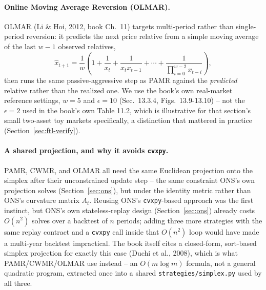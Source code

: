\documentclass[11pt]{article}
\begin{document}
\paragraph{Online Moving Average Reversion (OLMAR).}
OLMAR (Li \& Hoi, 2012, book Ch.~11) targets multi-period rather than
single-period reversion: it predicts the next price relative from a
simple moving average of the last $w-1$ observed relatives,
\[
    \hat{x}_{t+1} = \frac{1}{w}\left(1 + \frac{1}{x_t} + \frac{1}{x_t x_{t-1}}
    + \cdots + \frac{1}{\prod_{i=0}^{w-2} x_{t-i}}\right),
\]
then runs the same passive-aggressive step as PAMR against the
\emph{predicted} relative rather than the realized one. We use the
book's own real-market reference settings, $w=5$ and $\epsilon=10$
(Sec.~13.3.4, Figs.~13.9-13.10) -- not the $\epsilon=2$ used in the
book's own Table 11.2, which is illustrative for that section's small
two-asset toy markets specifically, a distinction that mattered in
practice (Section~\ref{sec:ftl-verify}).

\paragraph{A shared projection, and why it avoids \texttt{cvxpy}.}
PAMR, CWMR, and OLMAR all need the same Euclidean projection onto the
simplex after their unconstrained update step -- the same constraint
ONS's own projection solves (Section~\ref{sec:ons}), but under the
identity metric rather than ONS's curvature matrix $A_t$. Reusing
ONS's \texttt{cvxpy}-based approach was the first instinct, but ONS's
own stateless-replay design (Section~\ref{sec:ons}) already costs
$O(n^2)$ solves over a backtest of $n$ periods; adding three more
strategies with the same replay contract and a \texttt{cvxpy} call
inside that $O(n^2)$ loop would have made a multi-year backtest
impractical. The book itself cites a closed-form, sort-based simplex
projection for exactly this case (Duchi et al., 2008), which is what
PAMR/CWMR/OLMAR use instead -- an $O(m \log m)$ formula, not a general
quadratic program, extracted once into a shared
\texttt{strategies/simplex.py} used by all three.
\end{document}
